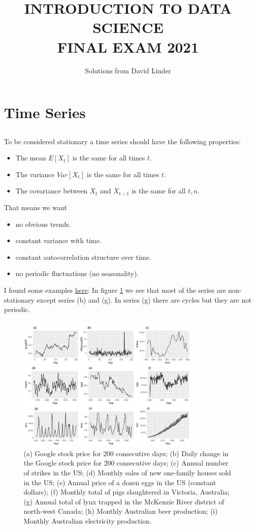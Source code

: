 \documentclass[]{article}
\title{\textbf{\normalsize INTRODUCTION TO DATA SCIENCE \\ \Large FINAL EXAM 2021}}
\author{Solutions from David Linder}
\begin{document}
	\maketitle
	\thispagestyle{fancy}
	\section{Time Series}
	\subsection{}
	To be considered stationary a time series should have the following properties:
	\begin{itemize}
		\item The mean $E[X_t]$ is the same for all times $t$.
		\item The variance $Var[X_t]$ is the same for all times $t$.
		\item The covariance between $X_t$ and $X_{t-1}$ is the same for all $t, n$.
	\end{itemize}
	That means we want
	\begin{itemize}
		\item no obvious trends.
		\item constant variance with time.
		\item constant autocorrelation structure over time.
		\item no periodic fluctuations (no seasonality).
	\end{itemize}
	I found some examples \href{https://otexts.com/fpp2/stationarity.html}{here}: In figure \ref{fig:time_series} we see that most of the series are non-stationary except series (b) and (g). In series (g) there are cycles but they are not periodic. 
	\begin{figure}
		\centering
		\includegraphics[width=0.8\textwidth]{images/time_series.png}
		\caption{(a) Google stock price for 200 consecutive days; (b) Daily change in the Google stock price for 200 consecutive days; (c) Annual number of strikes in the US; (d) Monthly sales of new one-family houses sold in the US; (e) Annual price of a dozen eggs in the US (constant dollars); (f) Monthly total of pigs slaughtered in Victoria, Australia; (g) Annual total of lynx trapped in the McKenzie River district of north-west Canada; (h) Monthly Australian beer production; (i) Monthly Australian electricity production.}
		\label{fig:time_series}
	\end{figure}
	
\end{document}
